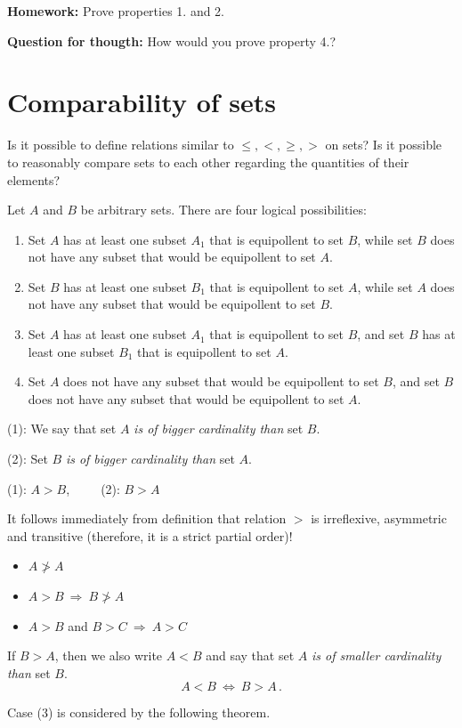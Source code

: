 \documentclass[11pt,paper=b5,footinclude,headinclude]{scrbook} %
\def\sledi {{~\Rightarrow~}}
\def\cee {{~\Leftrightarrow~}}
\theoremstyle{remark}
\theoremstyle{definition} %
\theoremstyle{theorem} %
\begin{document}
\textbf{ Homework:} Prove properties 1. and 2.

\textbf{ Question for thougth:} How would you prove property 4.?

\section{Comparability of sets}
Is it possible to define relations similar to
$\le , <, \ge, >$ on sets?
Is it possible to reasonably compare sets to each other regarding the quantities of their elements?

\bigskip
Let $A$ and $B$ be arbitrary sets. There are four logical possibilities:
\begin{enumerate}[(1)]
  \item Set $A$ has at least one subset $A_1$ that is equipollent to set $B$, while
  set $B$ does not have any subset that would be equipollent to set $A$.
  \item Set $B$ has at least one subset $B_1$ that is equipollent to set $A$, while
  set $A$ does not have any subset that would be equipollent to set $B$.
  \item Set $A$ has at least one subset $A_1$ that is equipollent to set $B$, and
  set $B$ has at least one subset $B_1$ that is equipollent to set $A$.
  \item Set $A$ does not have any subset that would be equipollent to set $B$, and
  set $B$ does not have any subset that would be equipollent to set $A$.
\end{enumerate}

(1): We say that set $A$ {\em is of bigger cardinality than} set $B$.

(2): Set  $B$ {\em is of bigger cardinality than} set $A$.

(1): $A>B$,~~~~~(2): $B>A$

\bigskip
It follows immediately from definition that relation  $>$
is irreflexive, asymmetric and transitive (therefore, it is a strict partial order)!
\begin{itemize}
  \item $A\ngtr A$
  \item $A>B\sledi B\ngtr A$
  \item $A>B$ and $B>C\sledi A> C$
\end{itemize}

If $B>A$, then we also write $A<B$ and say that set $A$ {\em is of smaller cardinality than} set $B$.
$$A<B\cee B>A\,.$$

\bigskip
Case (3) is considered by the following theorem.
\end{document}
